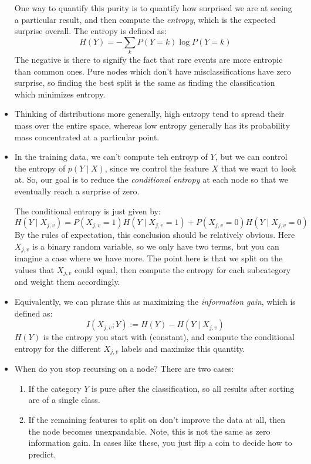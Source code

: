 \begin{itemize}
		One way to quantify this purity is to quantify how surprised we are at seeing a particular result,
		and then compute the \textit{entropy}, which is the expected surprise overall. The entropy is defined
		as:
		\[
			H(Y) = -\sum_k P(Y = k) \log P(Y = k)
		\]
		The negative is there to signify the fact that rare events are more entropic than common ones. Pure
		nodes which don't have misclassifications have zero surprise, so finding the best split is the same
		as finding the classification which minimizes entropy.    
	\item Thinking of distributions more generally, high entropy tend to spread their mass over the entire
		space, whereas low entropy generally has its probability mass concentrated at a particular point.   
	\item In the training data, we can't compute teh entroyp of \( Y \), but we can control the entropy of \(
		p(Y \mid X)\), since we control the feature \( X \) that we want to look at. So, our goal is to
		reduce the \textit{conditional entropy} at each node so that we eventually reach a surprise of zero. 

		The conditional entropy is just given by:
		\[
			H(Y \mid X_{j, v}) = P(X_{j, v} = 1) H(Y \mid X_{j, v} = 1) + P(X_{j, v} = 0) H(Y \mid X_{j, v} =
			0)
		\]
		By the rules of expectation, this conclusion should be relatively obvious. Here \( X_{j, v} \) is a
		binary random variable, so we only have two terms, but you can imagine a case where we have more. The
		point here is that we split on the values that \( X_{j, v} \) could equal, then compute the entropy
		for each subcategory and weight them accordingly.   

	\item Equivalently, we can phrase this as maximizing the \textit{information gain}, which is defined as:
		\[
			I(X_{j, v}; Y) := H(Y) - H(Y \mid X_{j, v})
		\]
		\( H(Y) \) is the entropy you start with (constant), and compute the conditional entropy for the
		different \( X_{j, v} \) labels and maximize this quantity.   

	\item When do you stop recursing on a node? There are two cases:
		\begin{enumerate}[label=\arabic*.]
			\item If the category \( Y \) is pure after the classification, so all results after sorting are
				of a single class.
			\item If the remaining features to split on don't improve the data at all, then the node becomes
				unexpandable. Note, this is not the same as zero information gain. In cases like these, you
				just flip a coin to decide how to predict. 


\end{enumerate}
\end{itemize}
